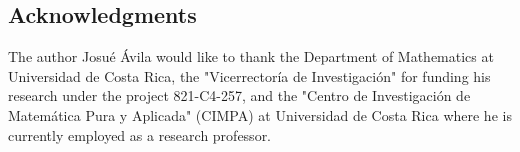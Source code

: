\documentclass{article}
\numberwithin{equation}{section}
\theoremstyle{plain}  %
\theoremstyle{definition}
\begin{document}
\subsection*{Acknowledgments} The author Josu\'e \'Avila would like to thank the Department of Mathematics at Universidad de Costa Rica, the "Vicerrector\'ia de Investigaci\'on" for funding his research under the project 821-C4-257, and the "Centro de Investigaci\'on de Matem\'atica Pura y Aplicada" (CIMPA) at Universidad de Costa Rica where he is currently employed as a research professor.

\printbibliography
\end{document}
